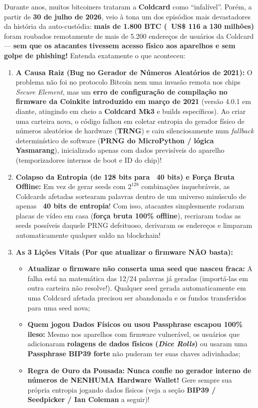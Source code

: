 \documentclass{pousadaguide}
\begin{document}
\begin{perigo}
Durante anos, muitos bitcoiners trataram a \textbf{Coldcard} como ``infalível''. Porém, a partir de \textbf{30 de julho de 2026}, veio à tona um dos episódios mais devastadores da história da auto-custódia: \textbf{mais de 1.800 BTC (~US\$ 116 a 130 milhões)} foram roubados remotamente de mais de 5.200 endereços de usuários da Coldcard — \textbf{sem que os atacantes tivessem acesso físico aos aparelhos e sem golpe de phishing!} Entenda exatamente o que aconteceu:
\begin{enumerate}
  \item \textbf{A Causa Raiz (Bug no Gerador de Números Aleatórios de 2021):} O problema não foi no protocolo Bitcoin nem uma invasão remota nos chips \emph{Secure Element}, mas um \textbf{erro de configuração de compilação no firmware da Coinkite introduzido em março de 2021} (versão 4.0.1 em diante, atingindo em cheio a \textbf{Coldcard Mk3} e builds específicos). Ao criar uma carteira nova, o código falhou em coletar entropia do gerador físico de números aleatórios de hardware (\textbf{TRNG}) e caiu silenciosamente num \emph{fallback} determinístico de software (\textbf{PRNG do MicroPython / lógica Yasmarang}), inicializado apenas com dados previsíveis do aparelho (temporizadores internos de boot e ID do chip)!
  \item \textbf{Colapso da Entropia (de 128 bits para ~40 bits) e Força Bruta Offline:} Em vez de gerar seeds com $2^{128}$ combinações inquebráveis, as Coldcards afetadas sortearam palavras dentro de um universo minúsculo de apenas \textbf{~40 bits de entropia}! Com isso, atacantes simplesmente rodaram placas de vídeo em casa (\textbf{força bruta 100\% offline}), recriaram todas as seeds possíveis daquele PRNG defeituoso, derivaram os endereços e limparam automaticamente qualquer saldo na blockchain!
  \item \textbf{As 3 Lições Vitais (Por que atualizar o firmware NÃO basta):}
  \begin{itemize}
    \item \textbf{Atualizar o firmware não conserta uma seed que nasceu fraca:} A falha está na matemática das 12/24 palavras já geradas (importá-las em outra carteira não resolve!). Qualquer seed gerada automaticamente em uma Coldcard afetada precisou ser abandonada e os fundos transferidos para uma seed nova;
    \item \textbf{Quem jogou Dados Físicos ou usou Passphrase escapou 100\% ileso:} Mesmo nos aparelhos com firmware vulnerável, os usuários que adicionaram \textbf{rolagens de dados físicos (\emph{Dice Rolls})} ou usaram uma \textbf{Passphrase BIP39 forte} não puderam ter suas chaves adivinhadas;
    \item \textbf{Regra de Ouro da Pousada:} \textbf{Nunca confie no gerador interno de números de NENHUMA Hardware Wallet!} Gere sempre sua própria entropia jogando dados físicos (veja a seção \textbf{BIP39 / Seedpicker / Ian Coleman} a seguir)!
  \end{itemize}
\end{enumerate}
\end{perigo}
\end{document}
